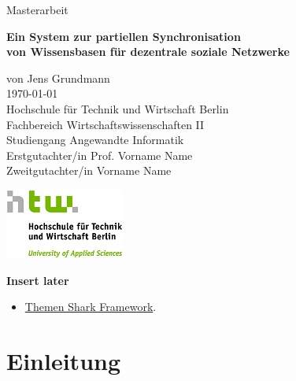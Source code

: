 \documentclass[a4paper]{article}
\begin{document}
	\begin{titlepage}
		\begin{flushright}	
			{\large Masterarbeit \\}
			\begin{Large}
				\textbf{
					Ein System zur partiellen Synchronisation \\ 
					von Wissensbasen für dezentrale soziale Netzwerke \\
				} 
			\end{Large}
			\vspace{1.0cm}
			\begin{large}	
				von Jens Grundmann \\
				\today \\
				\vspace{1.0cm}
				Hochschule für Technik und Wirtschaft Berlin \\
				Fachbereich Wirtschaftswissenschaften II \\
				Studiengang Angewandte Informatik \\
				\vspace{1.0cm}
				Erstgutachter/in Prof. Vorname Name \\
				Zweitgutachter/in Vorname Name \\	
				\vspace{0.5cm}
				\begin{center}
					\includegraphics{../Bilder/htw_logo.jpg}
				\end{center}				
			\end{large}
		\end{flushright}	
	\end{titlepage}
	
	\ClearWallPaper	
	\newpage
	
	{\LARGE \textbf{Insert later}}
	\begin{itemize}
		\item \hyperref[sec:sharkthemes]{Themen Shark Framework}.
	\end{itemize} 	
	
	\newpage	
	\tableofcontents
	\newpage


	\section{Einleitung}
	
\end{document}
